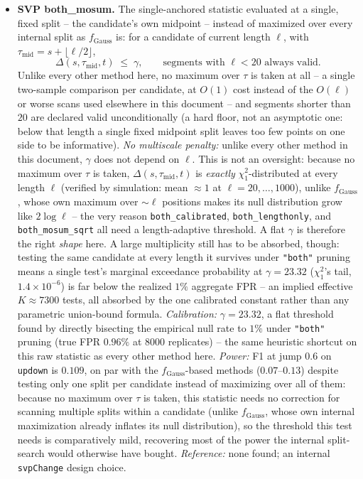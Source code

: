 \documentclass[11pt]{article}
\begin{document}
\begin{itemize}
\item \textbf{SVP both\_mosum.} The single-anchored statistic evaluated
at a single, fixed split -- the candidate's own midpoint -- instead of
maximized over every internal split as $f_{\mathrm{Gauss}}$ is: for a
candidate of current length $\ell$, with $\tau_{\mathrm{mid}}=s+\lfloor
\ell/2\rfloor$,
\[
\Delta(s,\tau_{\mathrm{mid}},t) \;\le\; \gamma,
\qquad \text{segments with } \ell<20 \text{ always valid}.
\]
Unlike every other method here, no maximum over $\tau$ is taken at all --
a single two-sample comparison per candidate, at $O(1)$ cost instead of
the $O(\ell)$ or worse scans used elsewhere in this document -- and
segments shorter than $20$ are declared valid unconditionally (a hard
floor, not an asymptotic one: below that length a single fixed midpoint
split leaves too few points on one side to be informative).
\emph{No multiscale penalty:} unlike every other method in this document,
$\gamma$ does not depend on $\ell$. This is not an oversight: because no
maximum over $\tau$ is taken, $\Delta(s,\tau_{\mathrm{mid}},t)$ is
\emph{exactly} $\chi^2_1$-distributed at every length $\ell$ (verified by
simulation: mean $\approx1$ at $\ell=20,\dots,1000$), unlike
$f_{\mathrm{Gauss}}$, whose own maximum over $\sim\ell$ positions makes its
null distribution grow like $2\log\ell$ -- the very reason
\texttt{both\_calibrated}, \texttt{both\_lengthonly}, and
\texttt{both\_mosum\_sqrt} all need a length-adaptive threshold. A flat $\gamma$
is therefore the right \emph{shape} here. A large multiplicity still has
to be absorbed, though: testing the same candidate at every length it
survives under \texttt{"both"} pruning means a single test's marginal
exceedance probability at $\gamma=23.32$ ($\chi^2_1$'s tail,
$1.4\times10^{-6}$) is far below the realized $1\%$ aggregate FPR -- an
implied effective $K\approx7300$ tests, all absorbed by the one calibrated
constant rather than any parametric union-bound formula.
\emph{Calibration:} $\gamma=23.32$, a flat threshold found by directly
bisecting the empirical null rate to $1\%$ under \texttt{"both"} pruning
(true FPR $0.96\%$ at $8000$ replicates) -- the same heuristic shortcut on
this raw statistic as every other method here. \emph{Power:} F1 at jump
$0.6$ on \texttt{updown} is $0.109$, on par with the $f_{\mathrm{Gauss}}$-based
methods ($0.07$--$0.13$) despite testing only one split per candidate
instead of maximizing over all of them: because no maximum over $\tau$ is
taken, this statistic needs no correction for scanning multiple splits
within a candidate (unlike $f_{\mathrm{Gauss}}$, whose own internal
maximization already inflates its null distribution), so the threshold
this test needs is comparatively mild, recovering most of the power the
internal split-search would otherwise have bought. \emph{Reference:} none
found; an internal \texttt{svpChange} design choice.

\end{itemize}
\end{document}
